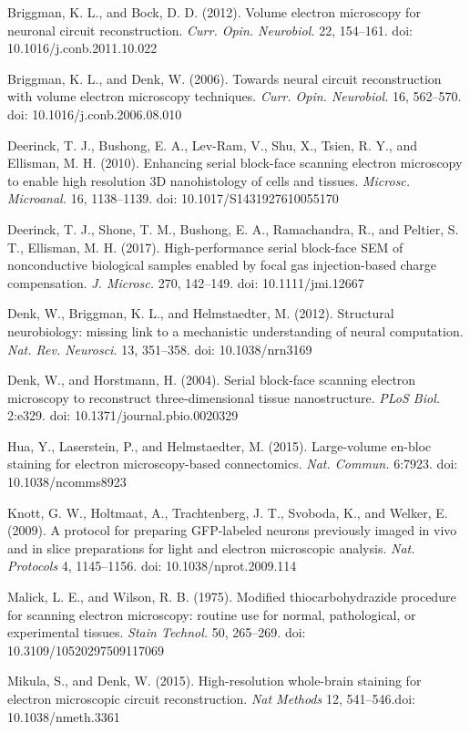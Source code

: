 \documentclass{article}
\newenvironment{reflist}{\par\small\setlength{\parindent}{0pt}\everypar{\hangindent=2.2em\hangafter=1\relax}}{\par}
\begin{document}
\begin{reflist}
Briggman, K. L., and Bock, D. D. (2012). Volume electron microscopy for neuronal circuit reconstruction. \emph{Curr. Opin. Neurobiol.} 22, 154–161. doi: 10.1016/j.conb.2011.10.022

Briggman, K. L., and Denk, W. (2006). Towards neural circuit reconstruction with volume electron microscopy techniques. \emph{Curr. Opin. Neurobiol.} 16, 562–570. doi: 10.1016/j.conb.2006.08.010

Deerinck, T. J., Bushong, E. A., Lev-Ram, V., Shu, X., Tsien, R. Y., and Ellisman, M. H. (2010). Enhancing serial block-face scanning electron microscopy to enable high resolution 3D nanohistology of cells and tissues. \emph{Microsc. Microanal.} 16, 1138–1139. doi: 10.1017/S1431927610055170

Deerinck, T. J., Shone, T. M., Bushong, E. A., Ramachandra, R., and Peltier, S. T., Ellisman, M. H. (2017). High-performance serial block-face SEM of nonconductive biological samples enabled by focal gas injection-based charge compensation. \emph{J. Microsc.} 270, 142–149. doi: 10.1111/jmi.12667

Denk, W., Briggman, K. L., and Helmstaedter, M. (2012). Structural neurobiology: missing link to a mechanistic understanding of neural computation. \emph{Nat. Rev. Neurosci.} 13, 351–358. doi: 10.1038/nrn3169

Denk, W., and Horstmann, H. (2004). Serial block-face scanning electron microscopy to reconstruct three-dimensional tissue nanostructure. \emph{PLoS Biol.} 2:e329. doi: 10.1371/journal.pbio.0020329

Hua, Y., Laserstein, P., and Helmstaedter, M. (2015). Large-volume en-bloc staining for electron microscopy-based connectomics. \emph{Nat. Commun.} 6:7923. doi: 10.1038/ncomms8923

Knott, G. W., Holtmaat, A., Trachtenberg, J. T., Svoboda, K., and Welker, E. (2009). A protocol for preparing GFP-labeled neurons previously imaged in vivo and in slice preparations for light and electron microscopic analysis. \emph{Nat. Protocols} 4, 1145–1156. doi: 10.1038/nprot.2009.114

Malick, L. E., and Wilson, R. B. (1975). Modified thiocarbohydrazide procedure for scanning electron microscopy: routine use for normal, pathological, or experimental tissues. \emph{Stain Technol.} 50, 265–269. doi: 10.3109/10520297509117069

Mikula, S., and Denk, W. (2015). High-resolution whole-brain staining for electron microscopic circuit reconstruction. \emph{Nat Methods} 12, 541–546.doi: 10.1038/nmeth.3361


\end{reflist}
\end{document}
